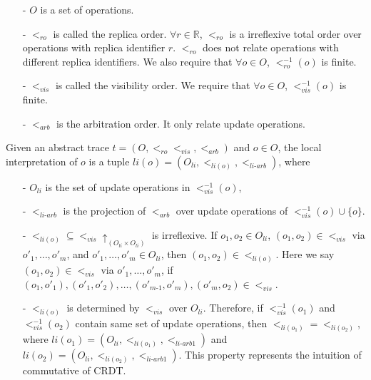 \begin{itemize}
\setlength{\itemsep}{0.5pt}
\item[-] $O$ is a set of operations.

\item[-] $<_{\textit{ro}}$ is called the replica order. $\forall r \in \mathbb{R}$, $<_{\textit{ro}}$ is a irreflexive total order over operations with replica identifier $r$. $<_{\textit{ro}}$ does not relate operations with different replica identifiers. We also require that $\forall o \in O$, $<_{\textit{ro}}^{-1}(o)$ is finite.

\item[-] $<_{\textit{vis}}$ is called the visibility order. We require that $\forall o \in O$, $<_{\textit{vis}}^{-1}(o)$ is finite.

\item[-] $<_{\textit{arb}}$ is the arbitration order. {\color {red}It only relate update operations.}
\end{itemize}

Given an abstract trace $t = (O,<_{\textit{ro}}<_{\textit{vis}},<_{\textit{arb}})$ and $o \in O$, {\color {red}the local interpretation of $o$ is a tuple $li(o) = ( O_{li} ,<_{li(o)}, <_{\textit{li-arb}} )$}, where

\begin{itemize}
\setlength{\itemsep}{0.5pt}
\item[-] {\color {red}$O_{li}$ is the set of update operations in $<_{\textit{vis}}^{-1}(o)$,}

\item[-] {\color {red}$<_{\textit{li-arb}}$ is the projection of $<_{\textit{arb}}$ over update operations of $<_{\textit{vis}}^{-1}(o) \cup \{ o \}$. }

\item[-] $<_{li(o)} \subseteq <_{\textit{vis}} \uparrow_{(O_{li} \times O_{li})}$ is irreflexive. {\color {red}If $o_1,o_2 \in O_{li}$, $(o_1,o_2) \in <_{\textit{vis}}$ via $o'_1,\ldots,o'_m$, and $o'_1,\ldots,o'_m \in O_{li}$, then $(o_1,o_2) \in <_{li(o)}$.} Here we say $(o_1,o_2) \in <_{\textit{vis}}$ via $o'_1,\ldots,o'_m$, if $(o_1,o'_1),(o'_1,o'_2),\ldots,(o'_{\textit{m-1}},o'_m),(o'_m,o_2) \in <_{\textit{vis}}$.

\item[-] {\color {red} $<_{li(o)}$ is determined by $<_{\textit{vis}}$ over $O_{li}$. Therefore, if $<_{\textit{vis}}^{-1}(o_1)$ and $<_{\textit{vis}}^{-1}(o_2)$ contain same set of update operations, then $<_{li(o_1)} = <_{li(o_2)}$,} where $li(o_1) = ( O_{li} ,<_{li(o_1)}, <_{\textit{li-arb1}} )$ and $li(o_2) = ( O_{li} ,<_{li(o_2)}, <_{\textit{li-arb1}} )$. This property represents the intuition of commutative of CRDT.
\end{itemize}

